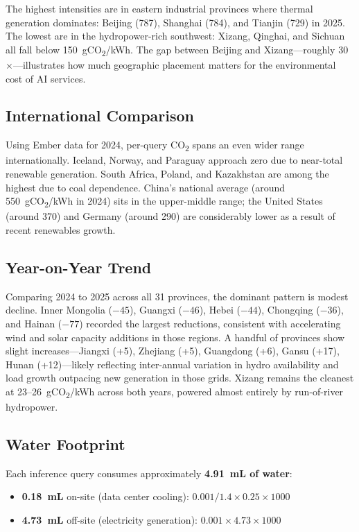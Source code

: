 \documentclass[11pt,a4paper]{article}
\begin{document}
The highest intensities are in eastern industrial provinces where thermal
generation dominates: Beijing (787), Shanghai (784), and Tianjin (729) in
2025. The lowest are in the hydropower-rich southwest: Xizang, Qinghai, and
Sichuan all fall below 150~gCO\textsubscript{2}/kWh. The gap between
Beijing and Xizang---roughly 30$\times$---illustrates how much geographic
placement matters for the environmental cost of AI services.

\subsection{International Comparison}

Using Ember data for 2024, per-query CO\textsubscript{2} spans an even
wider range internationally. Iceland, Norway, and Paraguay approach
zero due to near-total renewable generation. South Africa, Poland, and
Kazakhstan are among the highest due to coal dependence. China's national
average (around 550~gCO\textsubscript{2}/kWh in 2024) sits in the
upper-middle range; the United States (around 370) and Germany (around 290)
are considerably lower as a result of recent renewables growth.

\subsection{Year-on-Year Trend}

Comparing 2024 to 2025 across all 31 provinces, the dominant pattern is
modest decline. Inner Mongolia ($-45$), Guangxi ($-46$), Hebei ($-44$),
Chongqing ($-36$), and Hainan ($-77$) recorded the largest reductions,
consistent with accelerating wind and solar capacity additions in those
regions. A handful of provinces show slight increases---Jiangxi (+5),
Zhejiang (+5), Guangdong (+6), Gansu (+17), Hunan (+12)---likely reflecting
inter-annual variation in hydro availability and load growth outpacing new
generation in those grids. Xizang remains the cleanest at
23--26~gCO\textsubscript{2}/kWh across both years, powered almost entirely
by run-of-river hydropower.

\subsection{Water Footprint}

Each inference query consumes approximately \textbf{4.91~mL of water}:
\begin{itemize}
  \item \textbf{0.18~mL} on-site (data center cooling):
        $0.001 / 1.4 \times 0.25 \times 1000$
  \item \textbf{4.73~mL} off-site (electricity generation):
        $0.001 \times 4.73 \times 1000$
\end{itemize}
\end{document}
